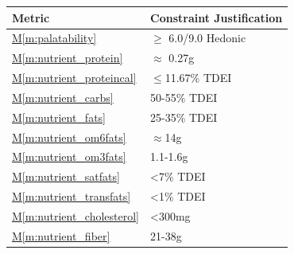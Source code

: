\documentclass{../tex/report}
\newcommand{\mref}[1]{\hyperref[#1]{M\ref{#1}}}
\begin{document}
\begin{tabular}{|l|p{14.35cm}|}
    \hline
    \textbf{Metric}                     & \textbf{Constraint                                                \hfill Justification}                                   \\ \hline
    \mref{m:palatability}               & $\ge$ 6.0/9.0 Hedonic                                             \hfill \cite{applicantguide,dsfc-phase2}                \\ \hline
    \mref{m:nutrient_protein}           & $\approx$ 0.27g                                                   \hfill \cite{applicantguide,dsfc-phase2,nutrition}      \\ \hline
    \mref{m:nutrient_proteincal}        & $\le$11.67\% TDEI                                                 \hfill \cite{applicantguide,dsfc-phase2,nutrition}      \\ \hline
    \mref{m:nutrient_carbs}             & 50-55\% TDEI                                                      \hfill \cite{applicantguide,dsfc-phase2,nutrition}      \\ \hline
    \mref{m:nutrient_fats}              & 25-35\% TDEI                                                      \hfill \cite{applicantguide,dsfc-phase2,nutrition}      \\ \hline
    \mref{m:nutrient_om6fats}           & $\approx$14g                                                      \hfill \cite{applicantguide,dsfc-phase2,nutrition}      \\ \hline
    \mref{m:nutrient_om3fats}           & 1.1-1.6g                                                          \hfill \cite{applicantguide,dsfc-phase2,nutrition}      \\ \hline
    \mref{m:nutrient_satfats}           & <7\% TDEI                                                         \hfill \cite{applicantguide,dsfc-phase2,nutrition}      \\ \hline
    \mref{m:nutrient_transfats}         & <1\% TDEI                                                         \hfill \cite{applicantguide,dsfc-phase2,nutrition}      \\ \hline
    \mref{m:nutrient_cholesterol}       & <300mg                                                            \hfill \cite{applicantguide,dsfc-phase2,nutrition}      \\ \hline
    \mref{m:nutrient_fiber}             & 21-38g                                                            \hfill \cite{applicantguide,dsfc-phase2,nutrition}      \\ \hline

\end{tabular}
\end{document}
